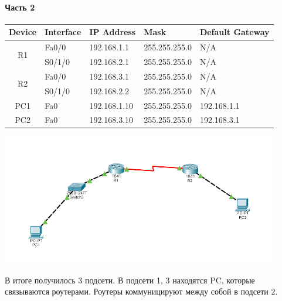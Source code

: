 \paragraph{Часть 2}
\begin{center}
    \begin{tabular}{|c|l|l|l|l|}
        \hline
        Device              & Interface & IP Address   & Mask          & Default Gateway \\
        \hline
        \multirow{2}{*}{R1} & Fa0/0     & 192.168.1.1  & 255.255.255.0 & N/A             \\
        \cline{2-5}
        ~                   & S0/1/0    & 192.168.2.1  & 255.255.255.0 & N/A             \\
        \hline
        \multirow{2}{*}{R2} & Fa0/0     & 192.168.3.1  & 255.255.255.0 & N/A             \\
        \cline{2-5}
        ~                   & S0/1/0    & 192.168.2.2  & 255.255.255.0 & N/A             \\
        \hline
        PC1                 & Fa0       & 192.168.1.10 & 255.255.255.0 & 192.168.1.1     \\
        \hline
        PC2                 & Fa0       & 192.168.3.10 & 255.255.255.0 & 192.168.3.1     \\
        \hline
    \end{tabular}
\end{center}

\includegraphics[width=0.9\textwidth]{resources/topology2}

В итоге получилось 3 подсети.
В подсети 1, 3 находятся PC, которые связываются роутерами.
Роутеры коммуницируют между собой в подсети 2.

